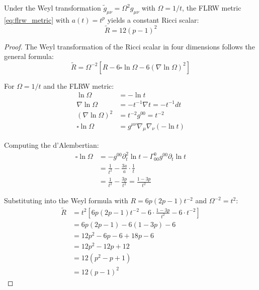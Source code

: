 \begin{theorem}
\label{thm:weyl_flrw_curvature}
Under the Weyl transformation $\tilde{g}_{\mu\nu} = \Omega^2 g_{\mu\nu}$ with $\Omega = 1/t$, the FLRW metric \eqref{eq:flrw_metric} with $a(t) = t^p$ yields a constant Ricci scalar:
\begin{equation}
\tilde{R} = 12(p-1)^2
\label{eq:weyl_ricci_constant}
\end{equation}
\end{theorem}

\begin{proof}
The Weyl transformation of the Ricci scalar in four dimensions follows the general formula:
\begin{equation}
\tilde{R} = \Omega^{-2} \left[ R - 6 \square \ln \Omega - 6 (\nabla \ln \Omega)^2 \right]
\label{eq:weyl_ricci_formula}
\end{equation}

For $\Omega = 1/t$ and the FLRW metric:
\begin{align}
\ln \Omega &= -\ln t \\
\nabla \ln \Omega &= -t^{-1} \nabla t = -t^{-1} dt \\
(\nabla \ln \Omega)^2 &= t^{-2} g^{00} = t^{-2} \\
\square \ln \Omega &= g^{\mu\nu} \nabla_\mu \nabla_\nu (-\ln t)
\end{align}

Computing the d'Alembertian:
\begin{align}
\square \ln \Omega &= -g^{00} \partial_t^2 \ln t - \Gamma^0_{00} g^{00} \partial_t \ln t \\
&= \frac{1}{t^2} - \frac{3\dot{a}}{a} \cdot \frac{1}{t} \\
&= \frac{1}{t^2} - \frac{3p}{t^2} = \frac{1-3p}{t^2}
\end{align}

Substituting into the Weyl formula with $R = 6p(2p-1)t^{-2}$ and $\Omega^{-2} = t^2$:
\begin{align}
\tilde{R} &= t^2 \left[ 6p(2p-1)t^{-2} - 6 \cdot \frac{1-3p}{t^2} - 6 \cdot t^{-2} \right] \\
&= 6p(2p-1) - 6(1-3p) - 6 \\
&= 12p^2 - 6p - 6 + 18p - 6 \\
&= 12p^2 - 12p + 12 \\
&= 12(p^2 - p + 1) \\
&= 12(p-1)^2
\end{align}
\end{proof}

